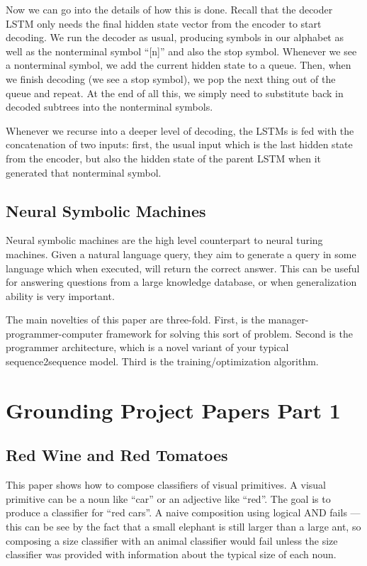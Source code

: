 \documentclass[12pt]{article}
\begin{document}
Now we can go into the details of how this is done. Recall that the decoder LSTM only needs the final hidden state vector from the encoder to start decoding. We run the decoder as usual, producing symbols in our alphabet as well as the nonterminal symbol ``[n]'' and also the stop symbol. Whenever we see a nonterminal symbol, we add the current hidden state to a queue. Then, when we finish decoding (we see a stop symbol), we pop the next thing out of the queue and repeat. At the end of all this, we simply need to substitute back in decoded subtrees into the nonterminal symbols.

Whenever we recurse into a deeper level of decoding, the LSTMs is fed with the concatenation of two inputs: first, the usual input which is the last hidden state from the encoder, but also the hidden state of the parent LSTM when it generated that nonterminal symbol. 

\subsection{Neural Symbolic Machines \cite{NeuralSymbolicMachines}}

Neural symbolic machines are the high level counterpart to neural turing machines. Given a natural language query, they aim to generate a query in some language which when executed, will return the correct answer. This can be useful for answering questions from a large knowledge database, or when generalization ability is very important.

The main novelties of this paper are three-fold. First, is the manager-programmer-computer framework for solving this sort of problem. Second is the programmer architecture, which is a novel variant of your typical sequence2sequence model. Third is the training/optimization algorithm.


\section{Grounding Project Papers Part 1}

\subsection{Red Wine and Red Tomatoes \cite{RedWine}}

This paper shows how to compose classifiers of visual primitives. A visual primitive can be a noun like ``car'' or an adjective like ``red''. The goal is to produce a classifier for ``red cars''. A naive composition using logical AND fails — this can be see by the fact that a small elephant is still larger than a large ant, so composing a size classifier with an animal classifier would fail unless the size classifier was provided with information about the typical size of each noun.
\end{document}
